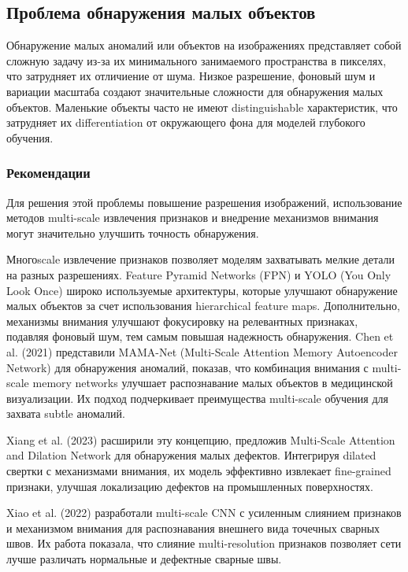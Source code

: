 \documentclass[14pt,a4paper]{article}
\begin{document}
\subsection{Проблема обнаружения малых объектов}

Обнаружение малых аномалий или объектов на изображениях представляет собой сложную задачу из-за их минимального занимаемого пространства в пикселях, что затрудняет их отличиение от шума. Низкое разрешение, фоновый шум и вариации масштаба создают значительные сложности для обнаружения малых объектов. Маленькие объекты часто не имеют distinguishable характеристик, что затрудняет их differentiation от окружающего фона для моделей глубокого обучения.

\subsubsection{Рекомендации}
Для решения этой проблемы повышение разрешения изображений, использование методов multi-scale извлечения признаков и внедрение механизмов внимания могут значительно улучшить точность обнаружения.

Многоscale извлечение признаков позволяет моделям захватывать мелкие детали на разных разрешениях. Feature Pyramid Networks (FPN) и YOLO (You Only Look Once) широко используемые архитектуры, которые улучшают обнаружение малых объектов за счет использования hierarchical feature maps. Дополнительно, механизмы внимания улучшают фокусировку на релевантных признаках, подавляя фоновый шум, тем самым повышая надежность обнаружения. Chen et al. (2021) представили MAMA-Net (Multi-Scale Attention Memory Autoencoder Network) для обнаружения аномалий, показав, что комбинация внимания с multi-scale memory networks улучшает распознавание малых объектов в медицинской визуализации. Их подход подчеркивает преимущества multi-scale обучения для захвата subtle аномалий.

Xiang et al. (2023) расширили эту концепцию, предложив Multi-Scale Attention and Dilation Network для обнаружения малых дефектов. Интегрируя dilated свертки с механизмами внимания, их модель эффективно извлекает fine-grained признаки, улучшая локализацию дефектов на промышленных поверхностях.

Xiao et al. (2022) разработали multi-scale CNN с усиленным слиянием признаков и механизмом внимания для распознавания внешнего вида точечных сварных швов. Их работа показала, что слияние multi-resolution признаков позволяет сети лучше различать нормальные и дефектные сварные швы.
\end{document}
